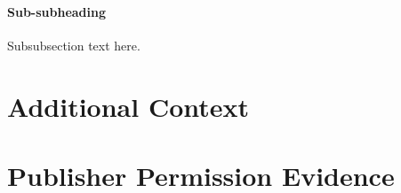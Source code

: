 \documentclass{muthesis2026}
\begin{document}
\subsubsection{Sub-subheading}
Subsubsection text here.


\chapter{Additional Context}




\appendix
\chapter{Publisher Permission Evidence}

\biography
\end{document}
